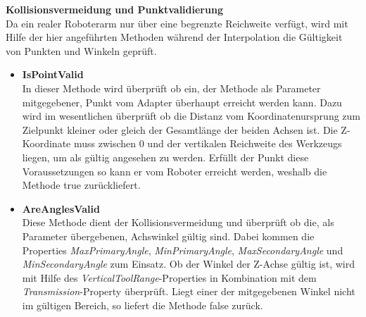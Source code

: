 \textbf{Kollisionsvermeidung und Punktvalidierung}\\
Da ein realer Roboterarm nur über eine begrenzte Reichweite verfügt, wird mit Hilfe der hier angeführten Methoden während der Interpolation die Gültigkeit von Punkten und Winkeln geprüft.
\begin{itemize} 
\item \textbf{IsPointValid}\\
In dieser Methode wird überprüft ob ein, der Methode als Parameter mitgegebener, Punkt vom Adapter überhaupt erreicht werden kann. Dazu wird im wesentlichen überprüft ob die Distanz vom Koordinatenursprung zum Zielpunkt kleiner oder gleich der Gesamtlänge der beiden Achsen ist. Die Z-Koordinate muss zwischen 0 und der vertikalen Reichweite des Werkzeugs liegen, um als gültig angesehen zu werden. Erfüllt der Punkt diese Voraussetzungen so kann er vom Roboter erreicht werden, weshalb die Methode true zurückliefert.
\item \textbf{AreAnglesValid}\\
Diese Methode dient der Kollisionsvermeidung und überprüft ob die, als Parameter übergebenen, Achswinkel gültig sind. Dabei kommen die Properties \textit{MaxPrimaryAngle}, \textit{MinPrimaryAngle}, \textit{MaxSecondaryAngle} und \textit{MinSecondaryAngle} zum Einsatz. Ob der Winkel der Z-Achse gültig ist, wird mit Hilfe des \textit{VerticalToolRange}-Properties in Kombination mit dem \textit{Transmission}-Property überprüft. Liegt einer der mitgegebenen Winkel nicht im gültigen Bereich, so liefert die Methode false zurück.
\end{itemize}

